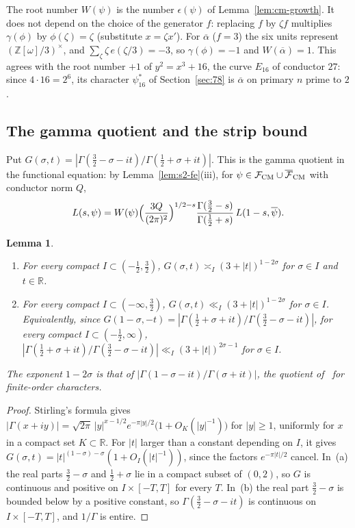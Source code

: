 \documentclass[11pt]{article}
\numberwithin{equation}{section}
\newcommand{\OO}{\mathbb Z[\omega]}
\newtheorem{lemma}{Lemma}
\begin{document}
The root number $W(\psi)$ is the number $\epsilon(\psi)$ of Lemma~\ref{lem:cm-growth}. It does not depend on
the choice of the generator $f$: replacing $f$ by $\zeta f$ multiplies $\gamma(\phi)$ by $\phi(\zeta)=\zeta$
(substitute $x=\zeta x'$). For $\overline\alpha$ ($f=3$) the six units represent $(\OO/3)^\times$, and
$\sum_\zeta\zeta\,e(\zeta/3)=-3$, so $\gamma(\phi)=-1$ and $W(\overline\alpha)=1$. This agrees with the root
number $+1$ of $y^2=x^3+16$, the curve $E_{16}$ of conductor $27$: since $4\cdot16=2^6$, its character
$\psi_{16}^*$ of Section~\ref{sec:78} is $\overline\alpha$ on primary $n$ prime to $2$.

\subsection{The gamma quotient and the strip bound}\label{sec:s2-strip}
Put $G(\sigma,t)=|\Gamma(\frac32-\sigma-it)/\Gamma(\frac12+\sigma+it)|$. This is the gamma quotient in the
functional equation: by Lemma~\ref{lem:s2-fe}(iii), for $\psi\in\mathcal F_{\rm CM}\cup\overline{\mathcal F}_{\rm CM}$
with conductor norm $Q$,
\begin{equation}\label{eq:s2-fe-unc}
 L(s,\psi)=W(\psi)\Bigl(\frac{3Q}{(2\pi)^2}\Bigr)^{1/2-s}\frac{\Gamma(\frac32-s)}{\Gamma(\frac12+s)}\,L(1-s,\overline\psi).
\end{equation}

\begin{lemma}\label{lem:s2-gamma}
\begin{enumerate}
\item[(a)] For every compact $I\subset(-\frac12,\frac32)$, $G(\sigma,t)\asymp_I(3+|t|)^{1-2\sigma}$ for
 $\sigma\in I$ and $t\in\mathbb R$.
\item[(b)] For every compact $I\subset(-\infty,\frac32)$, $G(\sigma,t)\ll_I(3+|t|)^{1-2\sigma}$ for $\sigma\in I$.
 Equivalently, since $G(1-\sigma,-t)=|\Gamma(\frac12+\sigma+it)/\Gamma(\frac32-\sigma-it)|$, for every compact
 $I\subset(-\frac12,\infty)$,
 $|\Gamma(\frac12+\sigma+it)/\Gamma(\frac32-\sigma-it)|\ll_I(3+|t|)^{2\sigma-1}$ for $\sigma\in I$.
\end{enumerate}
The exponent $1-2\sigma$ is that of $|\Gamma(1-\sigma-it)/\Gamma(\sigma+it)|$, the quotient of~\cite{OAI78} for
finite-order characters.
\end{lemma}

\begin{proof}
Stirling's formula gives $|\Gamma(x+iy)|=\sqrt{2\pi}\,|y|^{x-1/2}e^{-\pi|y|/2}\bigl(1+O_K(|y|^{-1})\bigr)$ for $|y|\ge1$,
uniformly for $x$ in a compact set $K\subset\mathbb R$. For $|t|$ larger than a constant depending on $I$, it
gives $G(\sigma,t)=|t|^{(1-\sigma)-\sigma}(1+O_I(|t|^{-1}))$, since the factors $e^{-\pi|t|/2}$ cancel. In~(a)
the real parts $\frac32-\sigma$ and $\frac12+\sigma$ lie in a compact subset of $(0,2)$, so $G$ is continuous
and positive on $I\times[-T,T]$ for every $T$. In~(b) the real part $\frac32-\sigma$ is bounded below by a
positive constant, so $\Gamma(\frac32-\sigma-it)$ is continuous on $I\times[-T,T]$, and $1/\Gamma$ is entire.
\end{proof}
\end{document}
